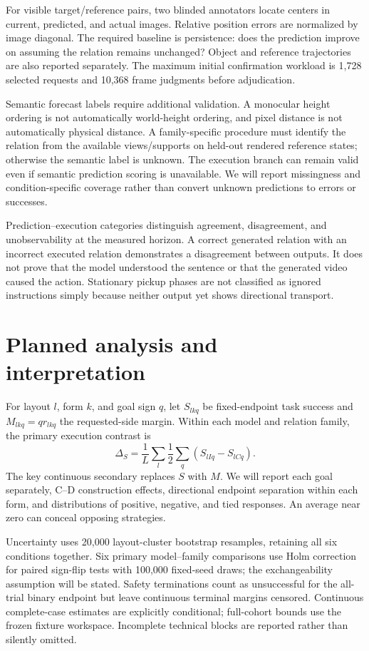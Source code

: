 \documentclass[11pt]{article}
\begin{document}
For visible target/reference pairs, two blinded annotators locate centers in current, predicted, and actual images. Relative position errors are normalized by image diagonal. The required baseline is persistence: does the prediction improve on assuming the relation remains unchanged? Object and reference trajectories are also reported separately. The maximum initial confirmation workload is 1,728 selected requests and 10,368 frame judgments before adjudication.

Semantic forecast labels require additional validation. A monocular height ordering is not automatically world-height ordering, and pixel distance is not automatically physical distance. A family-specific procedure must identify the relation from the available views/supports on held-out rendered reference states; otherwise the semantic label is unknown. The execution branch can remain valid even if semantic prediction scoring is unavailable. We will report missingness and condition-specific coverage rather than convert unknown predictions to errors or successes.

Prediction--execution categories distinguish agreement, disagreement, and unobservability at the measured horizon. A correct generated relation with an incorrect executed relation demonstrates a disagreement between outputs. It does not prove that the model understood the sentence or that the generated video caused the action. Stationary pickup phases are not classified as ignored instructions simply because neither output yet shows directional transport.

\section{Planned analysis and interpretation}
For layout $l$, form $k$, and goal sign $q$, let $S_{lkq}$ be fixed-endpoint task success and $M_{lkq}=q r_{lkq}$ the requested-side margin. Within each model and relation family, the primary execution contrast is
\begin{equation}
\Delta_S = \frac{1}{L}\sum_l\frac{1}{2}\sum_q(S_{lIq}-S_{lCq}).
\end{equation}
The key continuous secondary replaces $S$ with $M$. We will report each goal separately, C--D construction effects, directional endpoint separation within each form, and distributions of positive, negative, and tied responses. An average near zero can conceal opposing strategies.

Uncertainty uses 20,000 layout-cluster bootstrap resamples, retaining all six conditions together. Six primary model--family comparisons use Holm correction for paired sign-flip tests with 100,000 fixed-seed draws; the exchangeability assumption will be stated. Safety terminations count as unsuccessful for the all-trial binary endpoint but leave continuous terminal margins censored. Continuous complete-case estimates are explicitly conditional; full-cohort bounds use the frozen fixture workspace. Incomplete technical blocks are reported rather than silently omitted.
\end{document}
